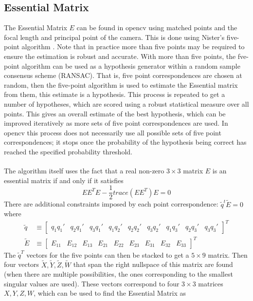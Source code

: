 \documentclass[12pt,a4paper]{article}
\begin{document}
\subsection{Essential Matrix}
\label{ssec: essential mat}
The Essential Matrix $E$ can be found in opencv using matched points and the focal length and principal point of the camera. This is done using Nister's five-point algorithm \cite{nister2003efficient}. Note that in practice more than five points may be required to ensure the estimation is robust and accurate. With more than five points, the fve-point algorithm can be used as a hypothesis generator within a random sample consensus scheme (RANSAC). That is, five point correspondences are chosen at random, then the five-point algorithm is used to estimate the Essential matrix from them, this estimate is a hypothesis. This process is repeated to get a number of hypotheses, which are scored using a robust statistical measure over all points. This gives an overall estimate of the best hypothesis, which can be improved iteratively as more sets of five point correspondences are used. In opencv this process does not necessarily use all possible sets of five point correspondences; it stops once the probability of the hypothesis being correct has reached the specified probability threshold.
\\\\
The algorithm itself uses the fact that a real non-zero $3\times 3$ matrix $E$ is an essential matrix if and only if it satisfies
\[
EE^TE - \frac{1}{2}trace(EE^T)E = 0
\]
There are additional constraints imposed by each point correspondence: $\tilde{q}^t \tilde{E} = 0$ where
\begin{align*}
\tilde{q} &\equiv \begin{bmatrix} q_1q_1' & q_2q_1' & q_3q_1' & q_1q_2' & q_2q_2' & q_3q_2' & q_1q_3' & q_2q_3' & q_3q_3' \end{bmatrix}^T \\
\tilde{E} &\equiv \begin{bmatrix} E_{11} & E_{12} & E_{13} & E_{21} & E_{22} & E_{23} & E_{31} & E_{32} & E_{33} \end{bmatrix}^T 
\end{align*}
The $\tilde{q}^T$ vectors for the five points can then be stacked to get a $5 \times 9$ matrix. Then four vectors $\tilde{X}, \tilde{Y}, \tilde{Z}, \tilde{W}$ that span the right nullspace of this matrix are found (when there are multiple possibilities, the ones corresponding to the smallest singular values are used). These vectors correspond to four $3\times 3$ matrices $X, Y, Z, W$, which can be used to find the Essential Matrix as 
\end{document}
